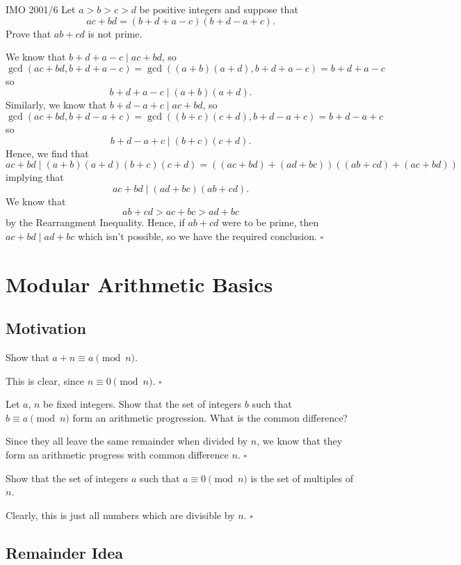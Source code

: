 \documentclass{article}
\begin{document}
\begin{problem}[1.12.19]{IMO 2001/6}
Let $a > b > c > d$ be positive integers and suppose that \[ac + bd = (b + d + a - c)(b + d - a + c).\] Prove that $ab + cd$ is not prime.
\end{problem}
We know that $b+d+a-c \mid ac+bd$, so \[\gcd(ac+bd, b+d+a-c) = \gcd((a+b)(a+d), b+d+a-c) = b+d+a-c\] so \[b+d+a-c \mid (a+b)(a+d).\] Similarly, we know that $b+d-a+c \mid ac+bd$, so \[\gcd(ac+bd, b+d-a+c) = \gcd((b+c)(c+d), b+d-a+c) = b+d-a+c\] so \[b+d-a+c \mid (b+c)(c+d).\] Hence, we find that \[ac+bd \mid (a+b)(a+d)(b+c)(c+d) = ((ac+bd)+(ad+bc))((ab+cd)+(ac+bd))\] implying that \[ac+bd \mid (ad+bc)(ab+cd).\] We know that \[ab+cd > ac+bc > ad+bc\] by the Rearrangment Inequality. Hence, if $ab+cd$ were to be prime, then $ac+bd \mid ad+bc$ which isn't possible, so we have the required conclusion. $\square$

\section{Modular Arithmetic Basics}

\subsection{Motivation}

\begin{problem}[2.1.1]{}
Show that $a + n \equiv a \pmod{n}$.
\end{problem}
This is clear, since $n \equiv 0 \pmod{n}$. $\square$

\begin{problem}[2.1.2]{}
Let $a$, $n$ be fixed integers. Show that the set of integers $b$ such that $b \equiv a \pmod{n}$ form an arithmetic progression. What is the common difference?
\end{problem}
Since they all leave the same remainder when divided by $n$, we know that they form an arithmetic progress with common difference $n$. $\square$

\begin{problem}[2.1.3]{}
Show that the set of integers $a$ such that $a \equiv 0 \pmod{n}$ is the set of multiples of $n$.
\end{problem}
Clearly, this is just all numbers which are divisible by $n$. $\square$

\subsection{Remainder Idea}
\end{document}
